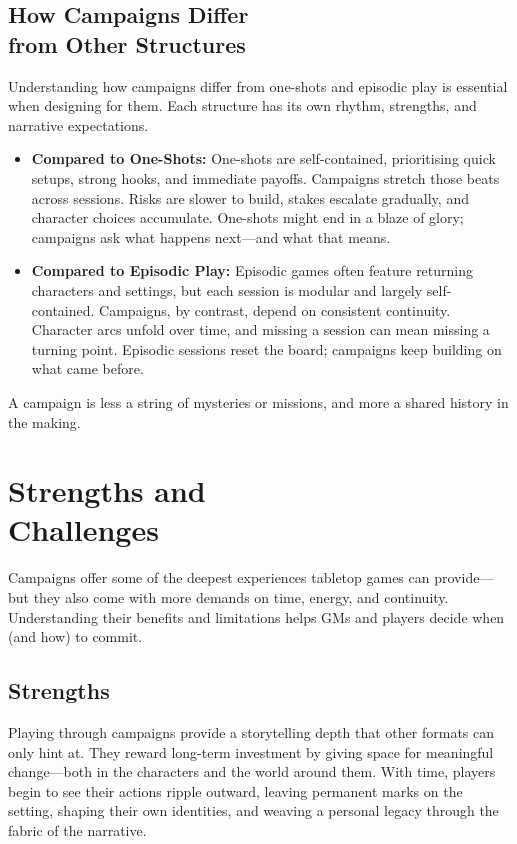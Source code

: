 \subsection*{How Campaigns Differ\\ from Other Structures}

Understanding how campaigns differ from one-shots and episodic play is essential when designing for them. Each structure has its own rhythm, strengths, and narrative expectations.

\begin{itemize}
    \item \textbf{Compared to One-Shots:}  
    One-shots are self-contained, prioritising quick setups, strong hooks, and immediate payoffs. Campaigns stretch those beats across sessions. Risks are slower to build, stakes escalate gradually, and character choices accumulate. One-shots might end in a blaze of glory; campaigns ask what happens next—and what that means.

    \item \textbf{Compared to Episodic Play:}  
    Episodic games often feature returning characters and settings, but each session is modular and largely self-contained. Campaigns, by contrast, depend on consistent continuity. Character arcs unfold over time, and missing a session can mean missing a turning point. Episodic sessions reset the board; campaigns keep building on what came before.
\end{itemize}

A campaign is less a string of mysteries or missions, and more a shared history in the making.

\section[Strengths and Challenges]{Strengths and\\ Challenges}

Campaigns offer some of the deepest experiences tabletop games can provide—but they also come with more demands on time, energy, and continuity. Understanding their benefits and limitations helps GMs and players decide when (and how) to commit.

\subsection*{Strengths}

Playing through campaigns provide a storytelling depth that other formats can only hint at. They reward long-term investment by giving space for meaningful change—both in the characters and the world around them. With time, players begin to see their actions ripple outward, leaving permanent marks on the setting, shaping their own identities, and weaving a personal legacy through the fabric of the narrative.

